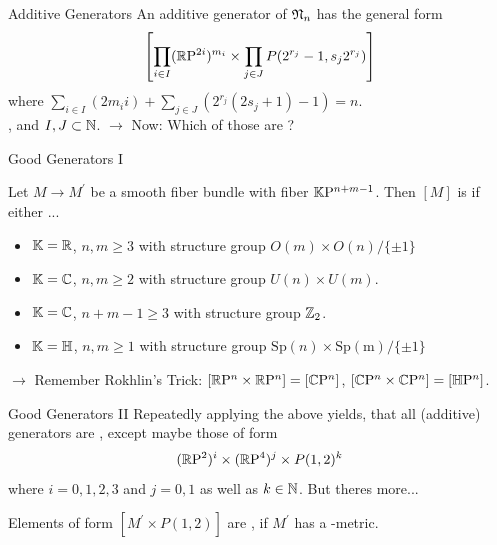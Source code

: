 \documentclass{presis}
\begin{document}
\begin{frame}{Additive Generators}
    An additive generator of $\mathfrak{N}_n$ has the general form
    \begin{equation*}
        \left[ \prod\limits_{i\in I} (\mathbb{R}\mathrm{P}^{2i})^{m_i} \times \prod\limits_{j\in J} P(2^{r_j} - 1, s_j 2^{r_j}) \right]
    \end{equation*}
    where $\sum_{i\in I} (2 m_i i) + \sum_{j\in J} (2^{r_j}(2 s_j + 1) - 1) = n$.\\\vspace{\baselineskip}, and $I,J\subset\mathbb{N}$. \pause
    $\rightarrow$ Now: Which of those are \good ?
\end{frame}

\begin{frame}{Good Generators I}
\begin{lem}
    Let $M \to M^\prime$ be a smooth fiber bundle with fiber $\mathbb{K}\mathrm{P}^{n + m - 1}$. Then $[M]$ is \good{} if either ...
    \begin{itemize}
        \item $\mathbb{K} = \mathbb{R}$, $n,m\geq 3$ with structure group $O(m)\times O(n) / \{\pm 1\}$
        \item $\mathbb{K} = \mathbb{C}$, $n,m \geq 2$ with structure group $U(n)\times U(m)$.
        \item $\mathbb{K} = \mathbb{C}$, $n + m -1 \geq 3$ with structure group $\mathbb{Z}_2$.
        \item $\mathbb{K} = \mathbb{H}$, $n,m\geq 1$ with structure group $\mathrm{Sp}(n)\times\mathrm{Sp(m)}/\{\pm 1\}$
    \end{itemize}
\end{lem}\pause
    $\rightarrow$ Remember Rokhlin's Trick: $[\mathbb{R}\mathrm{P}^n\times\mathbb{R}\mathrm{P}^n] = [\mathbb{C}\mathrm{P}^n]$, $[\mathbb{C}\mathrm{P}^n\times\mathbb{C}\mathrm{P}^n] = [\mathbb{H}\mathrm{P}^n]$.
\end{frame}

\begin{frame}{Good Generators II}
    Repeatedly applying the above yields, that all (additive) generators are \good{}, except maybe those of form 
    \begin{equation*}
        (\mathbb{R}\mathrm{P}^2)^{i} \times (\mathbb{R}\mathrm{P}^4)^{j} \times P(1,2)^k
    \end{equation*}
    where $i=0,1,2,3$ and $j=0,1$ as well as $k\in\mathbb{N}$.\pause{} 
    But theres more...\pause
    \begin{lem}
        Elements of form $[M^\prime \times P(1,2)]$ are \good , if $M^\prime$ has a \psc-metric.
    \end{lem}
\end{frame}
\end{document}
